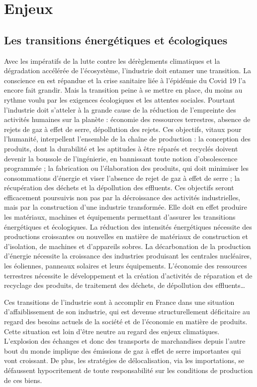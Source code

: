 \documentclass[a4paper]{article}
\begin{document}
\section{Enjeux}
\subsection{Les transitions énergétiques et écologiques}
Avec les impératifs de la lutte contre les dérèglements climatiques et la dégradation accélérée de l’écosystème, l’industrie doit entamer une transition. La conscience en est répandue et la crise sanitaire liée à l’épidémie du Covid 19 l’a encore fait grandir. Mais la transition peine à se mettre en place, du moins au rythme voulu par les exigences écologiques et les attentes sociales. Pourtant l’industrie doit s’atteler à la grande cause de la réduction de l’empreinte des activités humaines sur la planète : économie des ressources terrestres, absence de rejets de gaz à effet de serre, dépollution des rejets. Ces objectifs, vitaux pour l’humanité, interpellent l’ensemble de la chaîne de production : la conception des produits, dont la durabilité et les aptitudes à être réparés et recyclés doivent devenir la boussole de l’ingénierie, en bannissant toute notion d’obsolescence programmée ; la fabrication ou l’élaboration des produits, qui doit minimiser les consommations d’énergie et viser l’absence de rejet de gaz à effet de serre ; la récupération des déchets et la dépollution des effluents. Ces objectifs seront efficacement poursuivis non pas par la décroissance des activités industrielles, mais par la construction d’une industrie transformée. Elle doit en effet produire les matériaux, machines et équipements permettant d’assurer les transitions énergétiques et écologiques.  La réduction des intensités énergétiques nécessite des productions croissantes ou nouvelles en matière de matériaux de construction et d’isolation, de machines et d’appareils sobres. La décarbonation de  la production d’énergie  nécessite la croissance des industries  produisant les centrales nucléaires, les éoliennes, panneaux solaires et leurs équipements.  L’économie des ressources terrestres  nécessite le développement et la création d’activités de réparation et de recyclage des produits, de traitement des déchets, de dépollution des effluents…

Ces transitions de l’industrie sont à accomplir en France dans une situation d’affaiblissement de son industrie, qui est devenue structurellement déficitaire au regard des besoins actuels de la société et de l’économie en matière de produits. Cette situation est loin d’être neutre au regard des enjeux climatiques. L’explosion des échanges et donc des transports de marchandises depuis l’autre bout du monde implique des émissions de gaz à effet de serre importantes qui vont croissant. De plus, les stratégies de délocalisation, via les importations, se défaussent hypocritement de toute responsabilité sur les conditions de production de ces biens.
\end{document}

